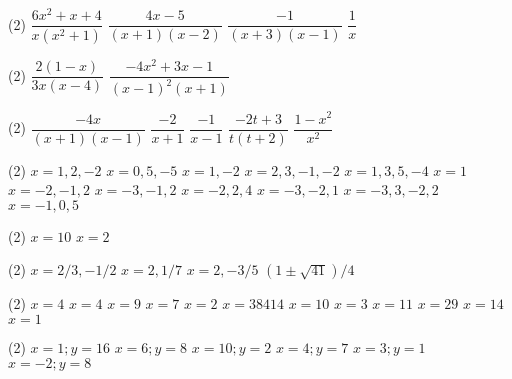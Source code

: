 \documentclass[11pt, a4paper, pdf]{article}
\let\frac\dfrac
\begin{document}
\begin{multicols}{2}
\begin{mylist}
\item
\begin{tasks}(2)
	\task $\frac{6x^2+x+4}{x(x^2+1)}$  
	\task $\frac{4x-5}{(x+1)(x-2)}$
	\task $\frac{-1}{(x+3)(x-1)}$
	\task $\frac{1}{x}$
\end{tasks}

\item 
\begin{tasks}(2)
	\task  $\frac{2(1-x)}{3x(x-4)}$
	\task $\frac{-4x^2+3x-1}{(x-1)^2 (x+1)}$
	
\end{tasks}



\item 
\begin{tasks}(2)
	\task $\frac{-4x}{(x+1)(x-1)} $  \task $\frac{-2}{x+1} $   \task  $\frac{-1}{x-1} $   \task $\frac{-2t+3}{t(t+2)} $      \task $\frac{1-x^{2} }{x^{2} } $  %
\end{tasks}

\item 
\begin{tasks}(2)
	\task $x=1, 2, -2  $    
	 \task $x=0, 5, -5  $          
	 \task  $x=1, -2    $   
	  \task $x=2, 3, -1, -2 $
	  \task $x=1, 3, 5, -4$
	\task $x=1 $   
	 \task $x=-2, -1, 2$            
	 \task $x=-3, -1, 2 $  
	 \task $x=-2, 2, 4   $             
	    \task $x=-3, -2, 1$     
	     \task $x=-3, 3, -2, 2$  
	     \task $x=-1, 0, 5$
\end{tasks}

 \item  
\begin{tasks}(2)
	\task $x=10$
	\task $x=2$
\end{tasks}


\item 

\begin{tasks}(2)
	\task $x= 2/3,  -1/2$ \task $x=2, 1/7$ \task $x=2, -3/5$     \task $(1\pm \sqrt{41} )/4$ 
\end{tasks}

\item  
\begin{tasks}(2)
	\task $x=4$    \task $x=4$    \task $x=9$   \task $x=7$   \task $x=2$    \task $x=38414$   \task $x=10$    \task $x=3$    \task $x=11$        \task $x=29$  \task $x=14$  \task  $x=1$
\end{tasks}

\item 
\begin{tasks}(2)
	\task $x=1; y=16$     \task $x=6; y=8$     \task $x=10; y=2$     \task $x=4; y=7$    \task $x=3; y=1$   \task  $x=-2; y=8$
\end{tasks}
 

\end{mylist}
\end{multicols}
\end{document}
